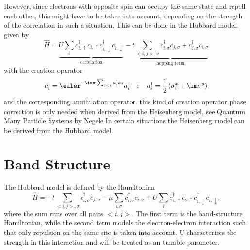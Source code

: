 \documentclass[a4paper,10pt]{report}
\begin{document}
However, since electrons with opposite spin can occupy the same state and repell each other, this might have to be taken into account, depending on the 
strength of the correlation in such a situation. 
This can be done in the Hubbard model, given by
\begin{equation}
 \hat{H} = \underbrace{U \sum_i c^{\dagger}_{i,\uparrow}c_{i,\uparrow} c^{\dagger}_{i,\downarrow}c_{i,\downarrow} }_{\text{correlation}}
	    -\underbrace{t \sum_{<i,j>,\sigma} c^{\dagger}_{i,\sigma}c_{j,\sigma} + c^{\dagger}_{j,\sigma}c_{i,\sigma} }_{\text{hopping term}}
\end{equation}
with the creation operator 
\begin{equation}
 c^{\dagger}_{i} = \euler^{-\im\pi \sum_{j<i} a^{\dagger}_j a_j } a^{\dagger}_i\quad ; \quad a^{\dagger}_i = \frac12 \left( \sigma^x_i + \im \sigma^y \right)
\end{equation}
and the corresponding annihilation operator. 
 this kind of creation operator phase correction is only needed when derived from the Heisenberg model, see Quantum Many Particle Systems by Negele
In certain situations the Heisenberg model can be derived from the Hubbard model. 

\section{Band Structure}



The Hubbard model is defined by the Hamiltonian
\begin{equation}
 \hat{H} = - t \sum_{<i,j>,\sigma} c^{\dagger}_{i,\sigma}c_{j,\sigma} 
	    -\mu \sum_{i,\sigma} c^{\dagger}_{i,\sigma}c_{i;\sigma}
	   + U \sum_i c^{\dagger}_{i,\uparrow}c_{i,\uparrow} c^{\dagger}_{i,\downarrow}c_{i,\downarrow} 
	    . \label{Hubbard_space}
\end{equation}
where the sum runs over all pairs $<i,j>$.
The first term is the band-structure Hamiltonian, while the second term models the electron-electron interaction such that only repulsion on the same site is taken into account. 
U characterizes the strength in this interaction and will be treated as an tunable parameter. 
\end{document}
